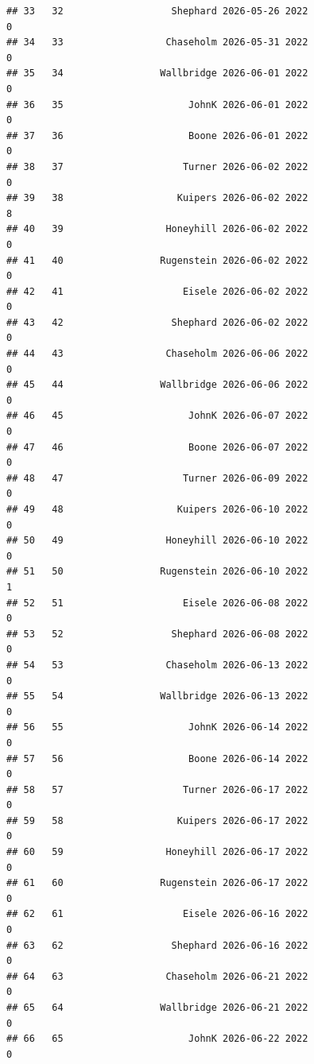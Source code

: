 \documentclass[
]{article}
\begin{document}
\begin{verbatim}
## 33   32                   Shephard 2026-05-26 2022                       0
## 34   33                  Chaseholm 2026-05-31 2022                       0
## 35   34                 Wallbridge 2026-06-01 2022                       0
## 36   35                      JohnK 2026-06-01 2022                       0
## 37   36                      Boone 2026-06-01 2022                       0
## 38   37                     Turner 2026-06-02 2022                       0
## 39   38                    Kuipers 2026-06-02 2022                       8
## 40   39                  Honeyhill 2026-06-02 2022                       0
## 41   40                 Rugenstein 2026-06-02 2022                       0
## 42   41                     Eisele 2026-06-02 2022                       0
## 43   42                   Shephard 2026-06-02 2022                       0
## 44   43                  Chaseholm 2026-06-06 2022                       0
## 45   44                 Wallbridge 2026-06-06 2022                       0
## 46   45                      JohnK 2026-06-07 2022                       0
## 47   46                      Boone 2026-06-07 2022                       0
## 48   47                     Turner 2026-06-09 2022                       0
## 49   48                    Kuipers 2026-06-10 2022                       0
## 50   49                  Honeyhill 2026-06-10 2022                       0
## 51   50                 Rugenstein 2026-06-10 2022                       1
## 52   51                     Eisele 2026-06-08 2022                       0
## 53   52                   Shephard 2026-06-08 2022                       0
## 54   53                  Chaseholm 2026-06-13 2022                       0
## 55   54                 Wallbridge 2026-06-13 2022                       0
## 56   55                      JohnK 2026-06-14 2022                       0
## 57   56                      Boone 2026-06-14 2022                       0
## 58   57                     Turner 2026-06-17 2022                       0
## 59   58                    Kuipers 2026-06-17 2022                       0
## 60   59                  Honeyhill 2026-06-17 2022                       0
## 61   60                 Rugenstein 2026-06-17 2022                       0
## 62   61                     Eisele 2026-06-16 2022                       0
## 63   62                   Shephard 2026-06-16 2022                       0
## 64   63                  Chaseholm 2026-06-21 2022                       0
## 65   64                 Wallbridge 2026-06-21 2022                       0
## 66   65                      JohnK 2026-06-22 2022                       0

\end{verbatim}
\end{document}
